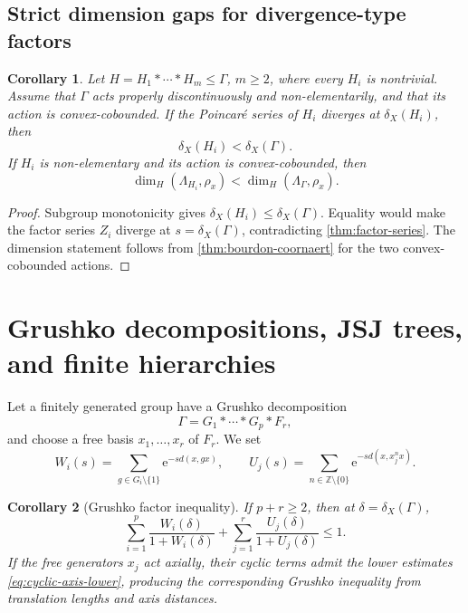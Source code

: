 \documentclass[11pt]{article}
\newtheorem{corollary}[corollary]{Corollary}
\theoremstyle{definition}
\newcommand{\Z}{\mathbb Z}
\newcommand{\e}{\mathrm e}
\begin{document}
\subsection{Strict dimension gaps for divergence-type factors}

\begin{corollary}
\label{cor:factor-dimension-gap}
Let $H=H_1*\cdots*H_m\le\Gamma$, $m\ge2$, where every $H_i$ is nontrivial.  Assume that
$\Gamma$ acts properly
discontinuously and non-elementarily, and that its action is convex-cobounded.  If the Poincar\'e series of $H_i$
diverges at $\delta_X(H_i)$, then
\begin{equation}\label{eq:factor-exponent-gap}
 \delta_X(H_i)<\delta_X(\Gamma).
\end{equation}
If $H_i$ is non-elementary and its action is convex-cobounded, then
\begin{equation}\label{eq:factor-dimension-gap}
 \dim_H(\Lambda_{H_i},\rho_x)
 <\dim_H(\Lambda_\Gamma,\rho_x).
\end{equation}
\end{corollary}

\begin{proof}
Subgroup monotonicity gives $\delta_X(H_i)\le\delta_X(\Gamma)$.  Equality would make the
factor series $Z_i$ diverge at $s=\delta_X(\Gamma)$, contradicting
\cref{thm:factor-series}.  The dimension statement follows from
\cref{thm:bourdon-coornaert} for the two convex-cobounded actions.
\end{proof}

\section{Grushko decompositions, JSJ trees, and finite hierarchies}
\label{sec:hierarchies}

Let a finitely generated group have a Grushko decomposition
\[
 \Gamma=G_1*\cdots*G_p*F_r,
\]
and choose a free basis $x_1,\dots,x_r$ of $F_r$.  We set
\[
 W_i(s)=\sum_{g\in G_i\setminus\{1\}}\e^{-sd(x,gx)},
 \qquad
 U_j(s)=\sum_{n\in\Z\setminus\{0\}}\e^{-sd(x,x_j^n x)}.
\]

\begin{corollary}[Grushko factor inequality]
\label{cor:grushko}
If $p+r\ge2$, then at $\delta=\delta_X(\Gamma)$,
\begin{equation}\label{eq:grushko-factor}
 \sum_{i=1}^p\frac{W_i(\delta)}{1+W_i(\delta)}
 +\sum_{j=1}^r\frac{U_j(\delta)}{1+U_j(\delta)}
 \le1.
\end{equation}
If the free generators $x_j$ act axially, their cyclic terms admit the lower estimates
\eqref{eq:cyclic-axis-lower}, producing the corresponding Grushko inequality from translation lengths and axis distances.
\end{corollary}
\end{document}
